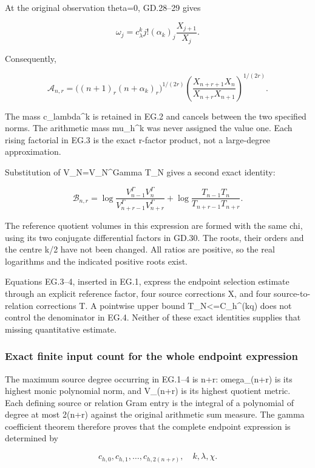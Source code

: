 At the original observation theta=0, GD.28--29 gives

\[
\omega_j=c_\lambda^k j!(\alpha_k)_j\frac{X_{j+1}}{X_j}.
\tag{EG.2}
\]

Consequently,

\[
\boxed{
\mathcal A_{n,r}
=\bigl((n+1)_r(n+\alpha_k)_r\bigr)^{1/(2r)}
\left(\frac{X_{n+r+1}X_n}{X_{n+r}X_{n+1}}\right)^{1/(2r)}.
}
\tag{EG.3}
\]

The mass c\_lambda\^{}k is retained in EG.2 and cancels between the two specified norms. The arithmetic mass mu\_h\^{}k was never assigned the value one. Each rising factorial in EG.3 is the exact r-factor product, not a large-degree approximation.

Substitution of V\_N=V\_N\^{}Gamma T\_N gives a second exact identity:

\[
\boxed{
\mathcal B_{n,r}
=\log\frac{V_{n-1}^\Gamma V_n^\Gamma}
               {V_{n+r-1}^\Gamma V_{n+r}^\Gamma}
+\log\frac{T_{n-1}T_n}{T_{n+r-1}T_{n+r}}.
}
\tag{EG.4}
\]

The reference quotient volumes in this expression are formed with the same chi, using its two conjugate differential factors in GD.30. The roots, their orders and the centre k/2 have not been changed. All ratios are positive, so the real logarithms and the indicated positive roots exist.

Equations EG.3--4, inserted in EG.1, express the endpoint selection estimate through an explicit reference factor, four source corrections X, and four source-to-relation corrections T. A pointwise upper bound T\_N\textless=C\_h\^{}(kq) does not control the denominator in EG.4. Neither of these exact identities supplies that missing quantitative estimate.

\subsubsection{Exact finite input count for the whole endpoint expression}\label{endpoint-eg_original--exact-finite-input-count-for-the-whole-endpoint-expression}

The maximum source degree occurring in EG.1--4 is n+r: omega\_(n+r) is its highest monic polynomial norm, and V\_(n+r) is its highest quotient metric. Each defining source or relation Gram entry is the integral of a polynomial of degree at most 2(n+r) against the original arithmetic sum measure. The gamma coefficient theorem therefore proves that the complete endpoint expression is determined by

\[
\boxed{c_{h,0},c_{h,1},\ldots,c_{h,2(n+r)},\quad k,\lambda,\chi.}
\tag{EG.5}
\]

